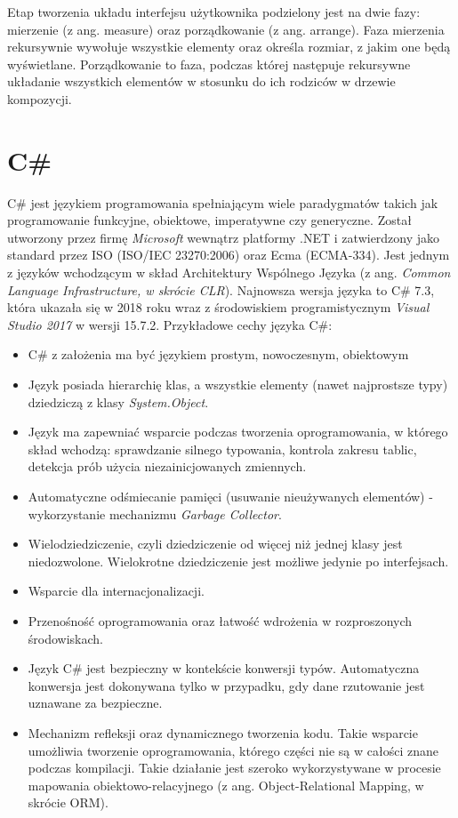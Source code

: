 Etap tworzenia układu interfejsu użytkownika podzielony jest na dwie fazy: mierzenie (z ang. measure) oraz porządkowanie (z ang. arrange). Faza mierzenia rekursywnie wywołuje wszystkie elementy oraz określa rozmiar, z jakim one będą wyświetlane. Porządkowanie to faza, podczas której następuje rekursywne układanie wszystkich elementów w stosunku do ich rodziców w drzewie kompozycji. 

\section{C\#}
 C\# jest językiem programowania spełniającym wiele paradygmatów takich jak programowanie funkcyjne, obiektowe, imperatywne czy generyczne. Został utworzony przez firmę \textit{Microsoft} wewnątrz platformy .NET i zatwierdzony jako standard przez ISO (ISO/IEC 23270:2006) oraz Ecma (ECMA-334). Jest jednym z języków wchodzącym w skład Architektury Wspólnego Języka (z ang. \textit{Common Language Infrastructure, w skrócie CLR}). Najnowsza wersja języka to C\# 7.3, która ukazała się w 2018 roku wraz z środowiskiem programistycznym \textit{Visual Studio 2017} w wersji 15.7.2.
 Przykładowe cechy języka C\#:
 \begin{itemize}
 	\item C\# z założenia ma być językiem prostym, nowoczesnym, obiektowym
 	\item Język posiada hierarchię klas, a wszystkie elementy (nawet najprostsze typy) dziedziczą z klasy \textit{System.Object}.
 	\item Język ma zapewniać wsparcie podczas tworzenia oprogramowania, w którego skład wchodzą: sprawdzanie silnego typowania, kontrola zakresu tablic, detekcja prób użycia niezainicjowanych zmiennych.
 	\item Automatyczne odśmiecanie pamięci (usuwanie nieużywanych elementów) - wykorzystanie mechanizmu \textit{Garbage Collector}.
 	\item Wielodziedziczenie, czyli dziedziczenie od więcej niż jednej klasy jest niedozwolone. Wielokrotne dziedziczenie jest możliwe jedynie po interfejsach.
 	\item Wsparcie dla internacjonalizacji.
 	\item Przenośność oprogramowania oraz łatwość wdrożenia w rozproszonych środowiskach. 
 	\item Język C\# jest bezpieczny w kontekście konwersji typów. Automatyczna konwersja jest dokonywana tylko w przypadku, gdy dane rzutowanie jest uznawane za bezpieczne.
 	\item Mechanizm refleksji oraz dynamicznego tworzenia kodu. Takie wsparcie umożliwia tworzenie oprogramowania, którego części nie są w całości znane podczas kompilacji.
 	Takie działanie jest szeroko wykorzystywane w procesie mapowania obiektowo-relacyjnego (z ang. Object-Relational Mapping, w skrócie ORM).
 \end{itemize} 


